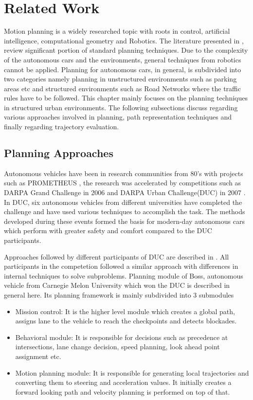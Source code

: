 \chapter{Related Work}
\label{related_work}
Motion planning is a widely researched topic with roots in control, artificial intelligence, computational geometry and Robotics. The literature presented in \cite{book_robot_motion_planning}, \cite{book_lavelle_planning} review significant portion of standard planning techniques. Due to the complexity of the autonomous cars and the environments, general techniques from robotics cannot be applied. Planning for autonomous cars, in general, is subdivided into two categories namely planning in unstructured environments such as parking areas etc and structured environments such as Road Networks where the traffic rules have to be followed. This chapter mainly focuses on the planning techniques in structured urban environments. The following subsections discuss regarding various approaches involved in planning, path representation techniques and finally regarding trajectory evaluation. 

\section{Planning Approaches}
\label{planning_aproaches}

Autonomous vehicles have been in research communities from 80's with projects such as PROMETHEUS \cite{prometheus}, the research was accelerated by competitions such as DARPA Grand Challenge in 2006 and DARPA Urban Challenge(DUC) in 2007 \cite{darpa_urban_challenge}. In DUC, six autonomous vehicles from different universities have completed the challenge and have used various techniques to accomplish the task. The methods developed during these events formed the basis for modern-day autonomous cars which perform with greater safety and comfort compared to the DUC participants. 

Approaches followed by different participants of DUC are described in \cite{darpa_urban_challenge}. All participants in the competetion followed a similar approach with differences in internal techniques to solve subproblems. Planning module of Boss, autonomous vehicle from Carnegie Melon University which won the DUC is described in general here. Its planning framework is mainly subdivided into 3 submodules 

\begin{itemize}
	\item Mission control: It is the higher level module which creates a global path, assigns lane to the vehicle to reach the checkpoints and detects blockades.
	\item Behavioral module: It is responsible for decisions such as precedence at intersections, lane change decision, speed planning, look ahead point assignment etc. 
	\item Motion planning module: It is responsible for generating local trajectories and converting them to steering and acceleration values. It initially creates a forward looking path and velocity planning is performed on top of that. 
\end{itemize}

